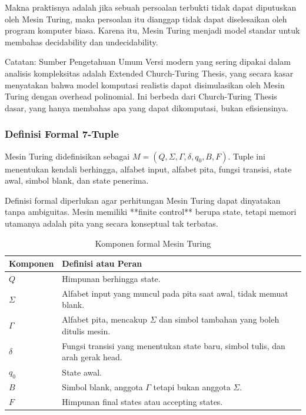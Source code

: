 Makna praktisnya adalah jika sebuah persoalan terbukti tidak dapat diputuskan oleh Mesin Turing, maka persoalan itu dianggap tidak dapat diselesaikan oleh program komputer biasa. Karena itu, Mesin Turing menjadi model standar untuk membahas decidability dan undecidability.

\begin{cmt}{Catatan: Sumber Pengetahuan Umum}{}
Versi modern yang sering dipakai dalam analisis kompleksitas adalah Extended Church-Turing Thesis, yang secara kasar menyatakan bahwa model komputasi realistis dapat disimulasikan oleh Mesin Turing dengan overhead polinomial. Ini berbeda dari Church-Turing Thesis dasar, yang hanya membahas apa yang dapat dikomputasi, bukan efisiensinya.
\end{cmt}

\subsubsection{Definisi Formal 7-Tuple}

\begin{jawab}
Mesin Turing didefinisikan sebagai $M=(Q,\Sigma,\Gamma,\delta,q_0,B,F)$. Tuple ini menentukan kendali berhingga, alfabet input, alfabet pita, fungsi transisi, state awal, simbol blank, dan state penerima.
\end{jawab}

Definisi formal diperlukan agar perhitungan Mesin Turing dapat dinyatakan tanpa ambiguitas. Mesin memiliki **finite control** berupa state, tetapi memori utamanya adalah pita yang secara konseptual tak terbatas.

\begin{table}[H]
\centering
\begin{tabularx}{\textwidth}{|L{0.20\textwidth}|X|}
\hline
\textbf{Komponen} & \textbf{Definisi atau Peran} \\
\hline
$Q$ & Himpunan berhingga state. \\
\hline
$\Sigma$ & Alfabet input yang muncul pada pita saat awal, tidak memuat blank. \\
\hline
$\Gamma$ & Alfabet pita, mencakup $\Sigma$ dan simbol tambahan yang boleh ditulis mesin. \\
\hline
$\delta$ & Fungsi transisi yang menentukan state baru, simbol tulis, dan arah gerak head. \\
\hline
$q_0$ & State awal. \\
\hline
$B$ & Simbol blank, anggota $\Gamma$ tetapi bukan anggota $\Sigma$. \\
\hline
$F$ & Himpunan final states atau accepting states. \\
\hline
\end{tabularx}
\caption{Komponen formal Mesin Turing}
\label{tab:komponen-tm}
\end{table}

